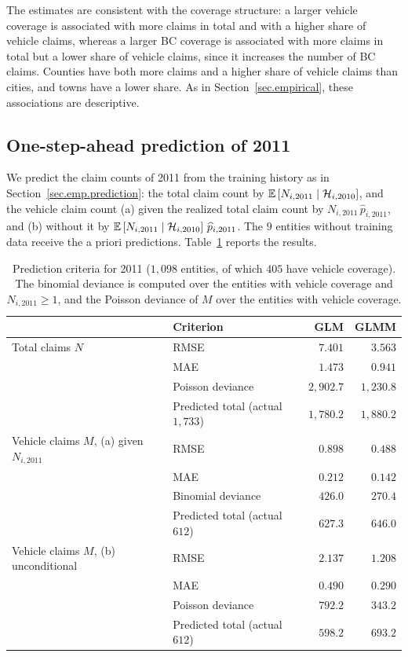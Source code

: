 The estimates are consistent with the coverage structure: a larger
vehicle coverage is associated with more claims in total and with a
higher share of vehicle claims, whereas a larger BC coverage is
associated with more claims in total but a lower share of vehicle
claims, since it increases the number of BC claims. Counties have both
more claims and a higher share of vehicle claims than cities, and towns
have a lower share. As in Section~\ref{sec.empirical}, these
associations are descriptive.

\subsection{One-step-ahead prediction of 2011}
\label{sec.lgpif.prediction}

We predict the claim counts of 2011 from the training history as in
Section~\ref{sec.emp.prediction}: the total claim count by
\({\mathbb E}\left[N_{i,2011}\mid\mathcal H_{i,2010}\right]\), and the vehicle claim count
(a) given the realized total claim count by
\(N_{i,2011}\,\widehat p_{i,2011}\), and (b) without it by
\({\mathbb E}\left[N_{i,2011}\mid\mathcal H_{i,2010}\right]\,\widehat p_{i,2011}\). The
\(9\) entities without training data receive the a priori predictions.
Table~\ref{tab.lgpif.crit} reports the results.

\begin{table}[htbp]
\centering
\caption{Prediction criteria for 2011 (\(1{,}098\) entities, of which
\(405\) have vehicle coverage). The binomial deviance is computed over the
entities with vehicle coverage and \(N_{i,2011}\ge1\), and the Poisson
deviance of \(M\) over the entities with vehicle coverage.}
\label{tab.lgpif.crit}
\small
\begin{tabular}{llrr}
\toprule
& Criterion & GLM & GLMM\\
\midrule
Total claims \(N\) & RMSE & \(7.401\) & \(3.563\)\\
& MAE & \(1.473\) & \(0.941\)\\
& Poisson deviance & \(2{,}902.7\) & \(1{,}230.8\)\\
& Predicted total (actual \(1{,}733\)) & \(1{,}780.2\) & \(1{,}880.2\)\\
\midrule
Vehicle claims \(M\), (a) given \(N_{i,2011}\) & RMSE & \(0.898\) & \(0.488\)\\
& MAE & \(0.212\) & \(0.142\)\\
& Binomial deviance & \(426.0\) & \(270.4\)\\
& Predicted total (actual \(612\)) & \(627.3\) & \(646.0\)\\
\midrule
Vehicle claims \(M\), (b) unconditional & RMSE & \(2.137\) & \(1.208\)\\
& MAE & \(0.490\) & \(0.290\)\\
& Poisson deviance & \(792.2\) & \(343.2\)\\
& Predicted total (actual \(612\)) & \(598.2\) & \(693.2\)\\
\bottomrule
\end{tabular}
\end{table}

